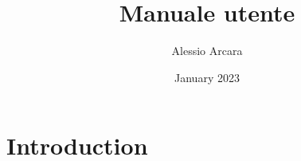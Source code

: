 \documentclass{article}
\title{Manuale utente}
\author{Alessio Arcara}
\date{January 2023}
\begin{document}
    \maketitle


    \section{Introduction}
\end{document}
